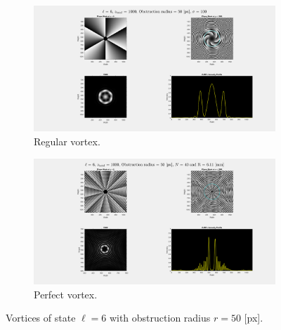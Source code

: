 \begin{figure}[htbp]
    \centering
    \begin{subfigure}[b]{0.45\textwidth}
        \centering
        \includegraphics[width=\textwidth]{images/Appendices/Additional_Results/Topological_Charge/reg_6_r50.png}
        \caption{Regular vortex.}
    \end{subfigure}
    \hfill
    \begin{subfigure}[b]{0.45\textwidth}
        \centering
        \includegraphics[width=\textwidth]{images/Appendices/Additional_Results/Topological_Charge/per_6_r50.png}
        \caption{Perfect vortex.}
    \end{subfigure}
    \caption{Vortices of state $\ell = 6$ with obstruction radius $r=50$ [px].}
    \label{fig:Vortices_L=6_r=50}
\end{figure}


